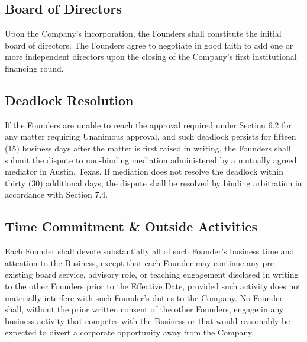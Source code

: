 \subsection{Board of Directors} Upon the Company's incorporation, the Founders shall constitute the initial board of directors. The Founders agree to negotiate in good faith to add one or more independent directors upon the closing of the Company's first institutional financing round.

\subsection{Deadlock Resolution} If the Founders are unable to reach the approval required under Section 6.2 for any matter requiring Unanimous approval, and such deadlock persists for fifteen (15) business days after the matter is first raised in writing, the Founders shall submit the dispute to non-binding mediation administered by a mutually agreed mediator in Austin, Texas. If mediation does not resolve the deadlock within thirty (30) additional days, the dispute shall be resolved by binding arbitration in accordance with Section 7.4.

\subsection{Time Commitment \& Outside Activities} Each Founder shall devote substantially all of such Founder's business time and attention to the Business, except that each Founder may continue any pre-existing board service, advisory role, or teaching engagement disclosed in writing to the other Founders prior to the Effective Date, provided such activity does not materially interfere with such Founder's duties to the Company. No Founder shall, without the prior written consent of the other Founders, engage in any business activity that competes with the Business or that would reasonably be expected to divert a corporate opportunity away from the Company.
